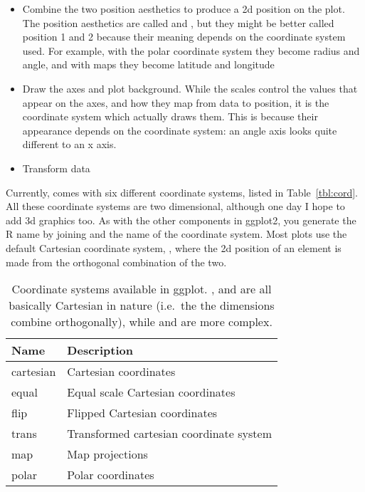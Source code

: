 \begin{itemize}
  \item Combine the two position aesthetics to produce a 2d position on the plot.  The position aesthetics are called  and , but they might be better called position 1 and 2 because their meaning depends on the coordinate system used.  For example, with the polar coordinate system they become radius and angle, and with maps they become latitude and longitude
  
  \item Draw the axes and plot background.  While the scales control the values that appear on the axes, and how they map from data to position, it is the coordinate system which actually draws them.  This is because their appearance depends on the coordinate system: an angle axis looks quite different to an x axis.

  \item Transform data

\end{itemize}

Currently, \ggplot comes with six different coordinate systems, listed in Table~\ref{tbl:cord}.  All these coordinate systems are two dimensional, although one day I hope to add 3d graphics too. As with the other components in ggplot2, you generate the R name by joining  and the name of the coordinate system.  Most plots use the default Cartesian coordinate system, , where the 2d position of an element is made from the orthogonal combination of the two.  


\begin{table}
  \begin{center}
  \begin{tabular}{ll}
    \toprule
    Name      & Description  \\
    \midrule
    cartesian & Cartesian coordinates                  \\
    equal     & Equal scale Cartesian coordinates      \\
    flip      & Flipped Cartesian coordinates          \\[1em]
    trans     & Transformed cartesian coordinate system\\
    map       & Map projections                        \\
    polar     & Polar coordinates                      \\
    \bottomrule
    
  \end{tabular}
  \end{center}
  \caption{Coordinate systems available in ggplot.  ,  and  are all basically Cartesian in nature (i.e.\ the the dimensions combine orthogonally), while  and  are more complex.}
  \label{tbl:coord}
\end{table}

